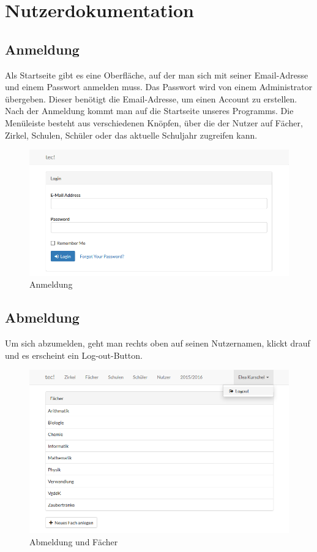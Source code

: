 \newpage
\section{Nutzerdokumentation}
\subsection{Anmeldung}
Als Startseite gibt es eine Oberfläche, auf der man sich mit seiner Email-Adresse und einem Passwort anmelden muss. Das Passwort wird von einem Administrator übergeben. Dieser benötigt die Email-Adresse, um einen Account zu erstellen. Nach der Anmeldung kommt man auf die Startseite unseres Programms. Die Menüleiste besteht aus verschiedenen Knöpfen, über die der Nutzer auf Fächer, Zirkel, Schulen, Schüler oder das aktuelle Schuljahr zugreifen kann.

\begin{figure}[h]
	\centering
	\includegraphics[scale=.48]{bilder/Anmeldung.png}
	\caption{Anmeldung}
\end{figure}

\subsection{Abmeldung}
Um sich abzumelden, geht man rechts oben auf seinen Nutzernamen, klickt drauf und es erscheint ein Log-out-Button.

\begin{figure}[h]
	\centering
	\includegraphics[scale=.48]{bilder/Abmeldung_Faecher.png}
	\caption{Abmeldung und Fächer}
\end{figure}

